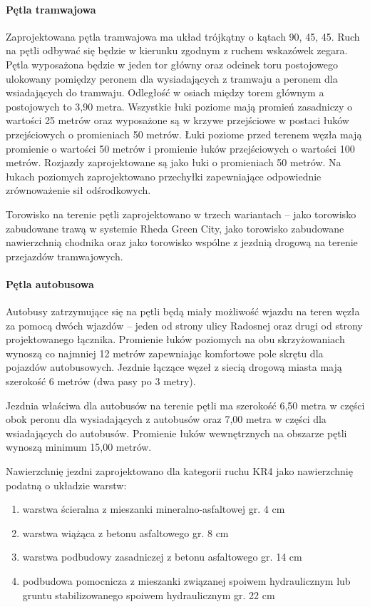 \documentclass[twoside,12pt]{article}
\begin{document}
	\paragraph{Pętla tramwajowa}\mbox{}
	
	Zaprojektowana pętla tramwajowa ma układ trójkątny o kątach 90\textdegree, 45\textdegree, 45\textdegree. Ruch na pętli odbywać się będzie w kierunku zgodnym z ruchem wskazówek zegara. Pętla wyposażona będzie w jeden tor główny oraz odcinek toru postojowego ulokowany pomiędzy peronem dla wysiadających z tramwaju a peronem dla wsiadających do tramwaju. Odległość w osiach między torem głównym a postojowych to 3,90 metra. Wszystkie łuki poziome mają promień zasadniczy o wartości 25 metrów oraz wyposażone są w krzywe przejściowe w postaci łuków przejściowych o promieniach 50 metrów. Łuki poziome przed terenem węzła mają promienie o wartości 50 metrów i promienie łuków przejściowych o wartości 100 metrów. Rozjazdy zaprojektowane są jako łuki o promieniach 50 metrów. Na łukach poziomych zaprojektowano przechyłki zapewniające odpowiednie zrównoważenie sił odśrodkowych. 
	
	Torowisko na terenie pętli zaprojektowano w trzech wariantach -- jako torowisko zabudowane trawą w systemie Rheda Green City, jako torowisko zabudowane nawierzchnią chodnika oraz jako torowisko wspólne z jezdnią drogową na terenie przejazdów tramwajowych.
	
	\paragraph{Pętla autobusowa}\mbox{}
	
	Autobusy zatrzymujące się na pętli będą miały możliwość wjazdu na teren węzła za pomocą dwóch wjazdów -- jeden od strony ulicy Radosnej oraz drugi od strony projektowanego łącznika. Promienie łuków poziomych na obu skrzyżowaniach wynoszą co najmniej 12 metrów zapewniając komfortowe pole skrętu dla pojazdów autobusowych. Jezdnie łączące węzeł z siecią drogową miasta mają szerokość 6 metrów (dwa pasy po 3 metry). 
	
	Jezdnia właściwa dla autobusów na terenie pętli ma szerokość 6,50 metra w części obok peronu dla wysiadających z autobusów oraz 7,00 metra w części dla wsiadających do autobusów. Promienie łuków wewnętrznych na obszarze pętli wynoszą minimum 15,00 metrów. 
	
	Nawierzchnię jezdni zaprojektowano dla kategorii ruchu KR4 jako nawierzchnię podatną o układzie warstw:
	\begin{enumerate}\setlength{\itemsep}{0em}
		\item warstwa ścieralna z mieszanki mineralno-asfaltowej gr. 4 cm
		\item warstwa wiążąca z betonu asfaltowego gr. 8 cm
		\item warstwa podbudowy zasadniczej z betonu asfaltowego gr. 14 cm
		\item podbudowa pomocnicza z mieszanki związanej spoiwem hydraulicznym lub gruntu stabilizowanego spoiwem hydraulicznym gr. 22 cm
	\end{enumerate}
	
\end{document}
